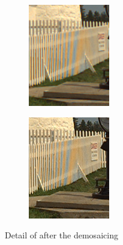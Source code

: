 \documentclass[a4paper,oneside]{article}
\begin{document}
\begin{figure}[htbp]
  \centering
  \begin{subfigure}{.5\textwidth}
  \centering
  \includegraphics[width=.8\linewidth]{demosaic_kodim19_artifact}
  \caption{}
\end{subfigure}%
\begin{subfigure}{.5\textwidth}
  \centering
  \includegraphics[width=.8\linewidth]{matlab_demosaic_kodim19_artifact}
  \caption{}
\end{subfigure}
\caption{Detail of  after the demosaicing}
\label{fig:artifact}
\end{figure}
\end{document}
